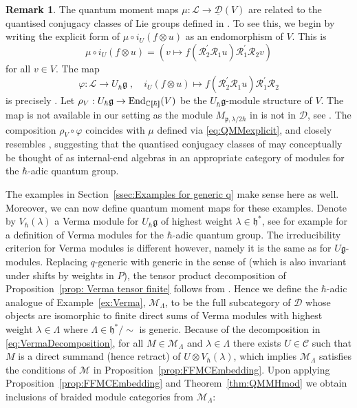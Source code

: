 \documentclass[12pt,dvipsnames]{article}
\numberwithin{equation}{section}
\theoremstyle{definition}
\newtheorem{remark}[definition]{Remark}
\newcommand{\cat}[1]{\mathcal{#1}}
\newcommand{\C}{\ensuremath{\mathbb{C}}}
\newcommand{\1}{\ensuremath{\mathbbm{1}}}
\newcommand{\llb}{[\hspace{-1.7pt}[}
\newcommand{\rrb}{]\hspace{-1.7pt}]}
\begin{document}
\begin{remark}\label{rem:Mudrov}
    The quantum moment maps $\mu:\mathcal{L}\to\underline{\cat{D}}(V)$ are related to the quantised conjugacy classes of Lie groups defined in \cite{Mu04}. To see this, we begin by writing the explicit form of $\mu \circ i_U(f\otimes u)$ as an endomorphism of $V$. This is
    \begin{equation}\label{eq:QMMexplicit}
        \mu \circ i_U(f\otimes u) = (v\mapsto f(\mathcal{R}_2^\prime\mathcal{R}_1 u)\mathcal{R}_1^\prime\mathcal{R}_2 v )
    \end{equation}
    for all $v\in V$. The map
    \begin{equation}
        \varphi:\mathcal{L} \to U_\hbar\mathfrak{g} \;,\quad i_U(f\otimes u) \mapsto f(\mathcal{R}_2^\prime\mathcal{R}_1 u)\mathcal{R}_1^\prime\mathcal{R}_2
    \end{equation}
    is precisely \cite[Eq.\,(21)]{Mu04}. Let $\rho_V:U_\hbar\mathfrak{g}\to\mathrm{End}_{\C\llb\hbar\rrb}(V)$ be the $U_\hbar\mathfrak{g}$-module structure of $V$. The map \cite[Eq.\,(23)]{Mu04} is not available in our setting as the module $M_{\mathfrak{p},\lambda/2\hbar}$ in \cite{Mu04} is not in $\cat{D}$, see \cite[Rem.\,3.3]{Mu04}. The composition $\rho_V\circ\varphi$ coincides with $\mu$ defined via \eqref{eq:QMMexplicit}, and closely resembles \cite[Eq.\,(23)]{Mu04}, suggesting that the quantised conjugacy classes of \cite{Mu04} may conceptually be thought of as internal-end algebras in an appropriate category of modules for the $\hbar$-adic quantum group. 
\end{remark}

The examples in Section~\ref{ssec:Examples for generic q} make sense here as well.  Moreover, we can now define quantum moment maps for these examples. Denote by $V_\hbar(\lambda)$ a Verma module for $U_\hbar\mathfrak{g}$ of highest weight $\lambda\in\mathfrak{h}^\ast$, see for example \cite[Sec.\,3.1]{Mu04} for a definition of Verma modules for the $\hbar$-adic quantum group. The irreducibility criterion for Verma modules is different however, namely it is the same as for $U\mathfrak{g}$-modules. Replacing $q$-generic with generic in the sense of \cite[Sec.\,3.2]{Mu04} (which is also invariant under shifts by weights in $P$), the tensor product decomposition of Proposition~\ref{prop: Verma tensor finite} follows from \cite[Prop.\,3.7]{Mu04}. Hence we define the $\hbar$-adic analogue of Example~\ref{ex:Verma}, $\cat{M}_\Lambda$, to be the full subcategory of $\cat{D}$ whose objects are isomorphic to finite direct sums of Verma modules with highest weight $\lambda\in\Lambda$ where $\Lambda\in\mathfrak{h}^\ast/\sim$ is generic. Because of the decomposition in \eqref{eq:VermaDecomposition}, for all $M\in\cat{M}_\Lambda$ and $\lambda\in\Lambda$ there exists $U\in\cat{C}$ such that $M$ is a direct summand (hence retract) of $U\otimes V_\hbar(\lambda)$, which implies $\cat{M}_\Lambda$ satisfies the conditions of $\cat{M}$ in Proposition~\ref{prop:FFMCEmbedding}. Upon applying Proposition~\ref{prop:FFMCEmbedding} and Theorem~\ref{thm:QMMHmod} we obtain inclusions of braided module categories from $\cat{M}_\Lambda$:
\end{document}
